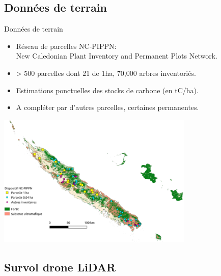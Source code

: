\documentclass[10pt,table,dvipsnames,compress]{beamer}
\begin{document}
\subsection{Données de terrain}
\label{sec:org896aece}

\begin{frame}[label={sec:orgd10d81c}]{Données de terrain}
\begin{itemize}
\item Réseau de parcelles NC-PIPPN:\\
New Caledonian Plant Inventory and Permanent Plots Network.
\item > 500 parcelles dont 21 de 1ha, 70,000 arbres inventoriés.
\item Estimations ponctuelles des stocks de carbone (en tC/ha).
\item A compléter par d'autres parcelles, certaines permanentes.
\end{itemize}

\begin{center}
\includegraphics[width=0.7\textwidth]{figs/ncpippn-plots.png}
\end{center}
\end{frame}

\subsection{Survol drone LiDAR}
\label{sec:org50f4a96}
\end{document}
